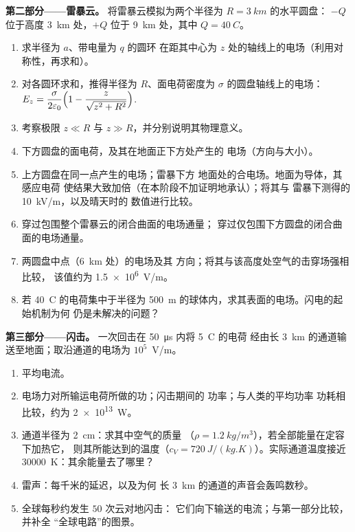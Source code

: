 \begin{problem}
\medskip
\noindent\textbf{第二部分——雷暴云。}
将雷暴云模拟为两个半径为 $R = \qty{3}{km}$ 的水平圆盘：
$-Q$ 位于高度 \qty{3}{km} 处，$+Q$ 位于 \qty{9}{km} 处，其中 $Q = \qty{40}{C}$。
\begin{enumerate}[resume]
  \item 求半径为 $a$、带电量为 $q$ 的圆环
        在距其中心为 $z$ 处的轴线上的电场（利用对称性，再求和）。
  \item 对各圆环求和，推得半径为 $R$、面电荷密度为 $\sigma$
        的圆盘轴线上的电场：
        $E_z = \dfrac{\sigma}{2\varepsilon_0}\Bigl(1 - \dfrac{z}{\sqrt{z^2 + R^2}}\Bigr)$.
  \item 考察极限 $z \ll R$ 与 $z \gg R$，并分别说明其物理意义。
  \item 下方圆盘的面电荷，及其在地面正下方处产生的
        电场（方向与大小）。
  \item 上方圆盘在同一点产生的电场；雷暴下方
        地面处的合电场。地面为导体，其感应电荷
        使结果大致加倍（在本阶段不加证明地承认）；将其与
        雷暴下测得的 \qty{10}{kV/m}，以及晴天时的
        数值进行比较。
  \item 穿过包围整个雷暴云的闭合曲面的电场通量；
        穿过仅包围下方圆盘的闭合曲面的电场通量。
  \item 两圆盘中点（\qty{6}{km} 处）的电场及其
        方向；将其与该高度处空气的击穿场强相比较，
        该值约为 \qty{1.5e6}{V/m}。
  \item 若 \qty{40}{C} 的电荷集中于半径为
        \qty{500}{m} 的球体内，求其表面的电场。闪电的起始机制为何
        仍是未解决的问题？
\end{enumerate}

\medskip
\noindent\textbf{第三部分——闪击。}
一次回击在 \qty{50}{\micro s} 内将 \qty{5}{C} 的电荷
经由长 \qty{3}{km} 的通道输送至地面；取沿通道的电场为
$10^5$~V/m。
\begin{enumerate}[resume]
  \item 平均电流。
  \item 电场力对所输运电荷所做的功；闪击期间的
        功率；与人类的平均功率
        功耗相比较，约为 \qty{2e13}{W}。
  \item 通道半径为 \qty{2}{cm}：求其中空气的质量
        （$\rho = \qty{1.2}{kg/m^3}$），若全部能量在定容下加热它，
        则其所能达到的温度（$c_V =
        \qty{720}{J/(kg.K)}$）。实际通道温度接近
        \qty{30000}{K}：其余能量去了哪里？
  \item 雷声：每千米的延迟，以及为何
        长 \qty{3}{km} 的通道的声音会轰鸣数秒。
  \item 全球每秒约发生 $50$ 次云对地闪击：
        它们向下输送的电流；与第一部分比较，并补全
        “全球电路”的图景。
\end{enumerate}


\end{problem}
